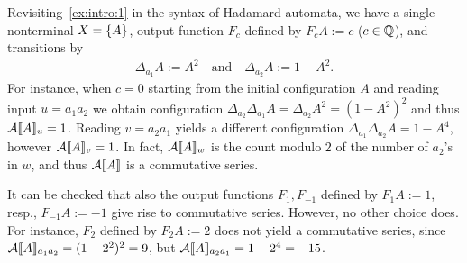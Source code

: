 \begin{example}
    \label{ex:Hadamard automaton 1}
    Revisiting~\cref{ex:intro:1} in the syntax of Hadamard automata,
    we have a single nonterminal $X = \left\{A\right\}$,
    output function $F_c$ defined by $F_c A := c$ ($c \in \mathbb Q$),
    and transitions by
    \begin{align*}
        \Delta_{a_1} A := A^2
            \quad\text{and}\quad
                \Delta_{a_2} A := 1 - A^2.
    \end{align*}
    For instance, when $c = 0$ starting from the initial configuration $A$ and reading input $u = a_1 a_2$
    we obtain configuration $\Delta_{a_2} \Delta_{a_1} A = \Delta_{a_2} A^2 = (1 - A^2)^2$
    and thus $\mathcal A\llbracket A\rrbracket_u = 1$.
    Reading $v = a_2 a_1$ yields a different configuration
    $\Delta_{a_1} \Delta_{a_2} A = 1 - A^4$,
    however $\mathcal A\llbracket A\rrbracket_v = 1$.
    In fact, $\mathcal A\llbracket A\rrbracket_w$ is the count modulo $2$ of the number of $a_2$'s in $w$,
    and thus $\mathcal A\llbracket A\rrbracket$ is a commutative series.

    It can be checked that also the output functions $F_1, F_{-1}$
    defined by $F_1 A := 1$, resp., $F_{-1} A := -1$
    give rise to commutative series.
    However, no other choice does.
    For instance, $F_2$ defined by $F_2 A := 2$ does not yield a commutative series,
    since $\mathcal A\llbracket A\rrbracket_{a_1 a_2} = (1 - 2^2)^2 = 9$,
    but $\mathcal A\llbracket A\rrbracket_{a_2 a_1} = 1 - 2^4 = -15$.
\end{example}

